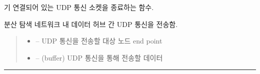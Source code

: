 \documentclass[a4paper,10pt,english]{sphinxmanual}
\begin{document}
\begin{fulllineitems}

\begin{fulllineitems}
\label{\detokenize{_kademlia:RPC.close}}
\pysigstartsignatures
{}
\pysigstopsignatures
\sphinxAtStartPar
기 연결되어 있는 UDP 통신 소켓을 종료하는 함수.

\end{fulllineitems}


\begin{fulllineitems}
\label{\detokenize{_kademlia:RPC.send}}
\pysigstartsignatures
{}
\pysigstopsignatures
\sphinxAtStartPar
분산 탐색 네트워크 내 데이터 허브 간 UDP 통신을 전송함.
\begin{quote}\begin{description}
\begin{itemize}
\item {} 
\sphinxAtStartPar
{} – UDP 통신을 전송할 대상 노드 end point

\item {} 
\sphinxAtStartPar
{} – (buffer) UDP 통신을 통해 전송할 데이터

\end{itemize}

\end{description}\end{quote}

\end{fulllineitems}


\end{fulllineitems}



\bigskip\hrule\bigskip


\sphinxstepscope
\end{document}
